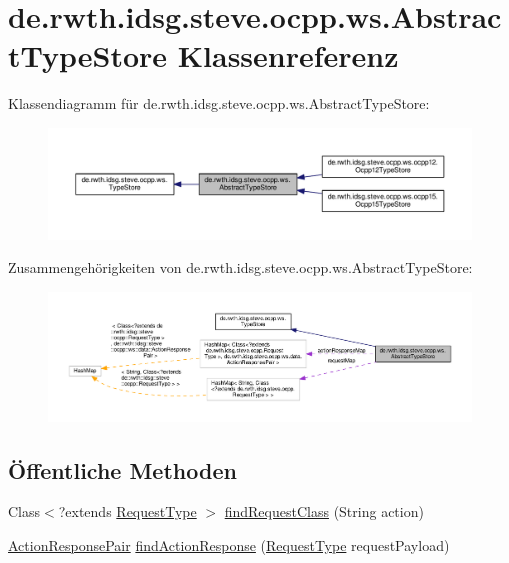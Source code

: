 \hypertarget{classde_1_1rwth_1_1idsg_1_1steve_1_1ocpp_1_1ws_1_1_abstract_type_store}{\section{de.\+rwth.\+idsg.\+steve.\+ocpp.\+ws.\+Abstract\+Type\+Store Klassenreferenz}
\label{classde_1_1rwth_1_1idsg_1_1steve_1_1ocpp_1_1ws_1_1_abstract_type_store}
}


Klassendiagramm für de.\+rwth.\+idsg.\+steve.\+ocpp.\+ws.\+Abstract\+Type\+Store\+:\nopagebreak
\begin{figure}[H]
\begin{center}
\leavevmode
\includegraphics[width=350pt]{classde_1_1rwth_1_1idsg_1_1steve_1_1ocpp_1_1ws_1_1_abstract_type_store__inherit__graph}
\end{center}
\end{figure}


Zusammengehörigkeiten von de.\+rwth.\+idsg.\+steve.\+ocpp.\+ws.\+Abstract\+Type\+Store\+:\nopagebreak
\begin{figure}[H]
\begin{center}
\leavevmode
\includegraphics[width=350pt]{classde_1_1rwth_1_1idsg_1_1steve_1_1ocpp_1_1ws_1_1_abstract_type_store__coll__graph}
\end{center}
\end{figure}
\subsection*{Öffentliche Methoden}
\begin{DoxyCompactItemize}
\item 
Class$<$?extends \hyperlink{interfacede_1_1rwth_1_1idsg_1_1steve_1_1ocpp_1_1_request_type}{Request\+Type} $>$ \hyperlink{classde_1_1rwth_1_1idsg_1_1steve_1_1ocpp_1_1ws_1_1_abstract_type_store_a8dc2b68097f448a5ca6570cff4625f99}{find\+Request\+Class} (String action)
\item 
\hyperlink{classde_1_1rwth_1_1idsg_1_1steve_1_1ocpp_1_1ws_1_1data_1_1_action_response_pair}{Action\+Response\+Pair} \hyperlink{classde_1_1rwth_1_1idsg_1_1steve_1_1ocpp_1_1ws_1_1_abstract_type_store_ae179f4e949bfa7cf3f86fbcb0052f3e3}{find\+Action\+Response} (\hyperlink{interfacede_1_1rwth_1_1idsg_1_1steve_1_1ocpp_1_1_request_type}{Request\+Type} request\+Payload)
\end{DoxyCompactItemize}

